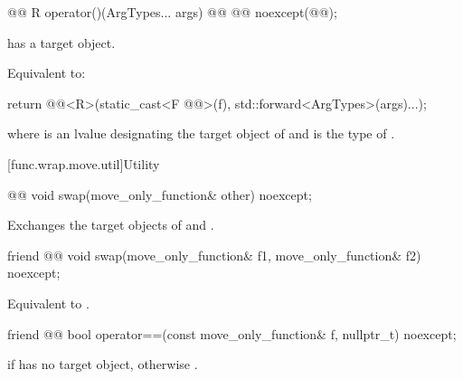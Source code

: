 \begin{itemdecl}
@@ R operator()(ArgTypes... args) @\cv{}@ @@ noexcept(@@);
\end{itemdecl}

\begin{itemdescr}
\pnum
\expects
{} has a target object.

\pnum
\effects
Equivalent to:
\begin{codeblock}
return @@<R>(static_cast<F @@>(f), std::forward<ArgTypes>(args)...);
\end{codeblock}
where  is an lvalue designating the target object of  and  is the type of .
\end{itemdescr}

[func.wrap.move.util]{Utility}

%
\begin{itemdecl}
@@ void swap(move_only_function& other) noexcept;
\end{itemdecl}

\begin{itemdescr}
\pnum
\effects
Exchanges the target objects of  and .
\end{itemdescr}

%
\begin{itemdecl}
friend @@ void swap(move_only_function& f1, move_only_function& f2) noexcept;
\end{itemdecl}

\begin{itemdescr}
\pnum
\effects
Equivalent to .
\end{itemdescr}

%
\begin{itemdecl}
friend @@ bool operator==(const move_only_function& f, nullptr_t) noexcept;
\end{itemdecl}

\begin{itemdescr}
\pnum
\returns
{} if  has no target object, otherwise .
\end{itemdescr}
